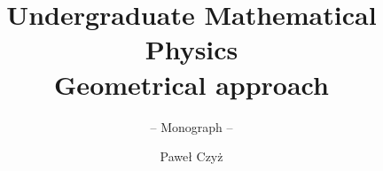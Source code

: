 \documentclass[envcountsame,envcountchap]{svmono}
\begin{document}
\author{Paweł Czyż}
\title{Undergraduate Mathematical Physics\\
{\small Geometrical approach}}
\subtitle{-- Monograph --}
\maketitle

\frontmatter%




\tableofcontents

\mainmatter%













%
%

\backmatter%


\printindex

\end{document}

